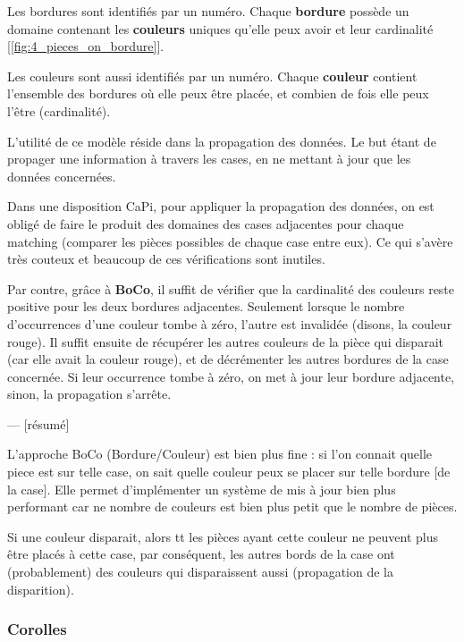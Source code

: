 	Les bordures sont identifiés par un numéro. Chaque \textbf{bordure} possède un domaine contenant les \textbf{couleurs} uniques qu'elle peux avoir et leur cardinalité [\autoref{fig:4_pieces_on_bordure}].
	
	Les couleurs sont aussi identifiés par un numéro. Chaque \textbf{couleur} contient l'ensemble des bordures où elle peux être placée, et combien de fois elle peux l'être (cardinalité).
	
	L'utilité de ce modèle réside dans la propagation des données. Le but étant de propager une information à travers les cases, en ne mettant à jour que les données concernées.
	
	Dans une disposition CaPi, pour appliquer la propagation des données, on est obligé de faire le produit des domaines des cases adjacentes pour chaque matching (comparer les pièces possibles de chaque case entre eux). Ce qui s'avère très couteux et beaucoup de ces vérifications sont inutiles.
	
	Par contre, grâce à \textbf{BoCo}, il suffit de vérifier que la cardinalité des couleurs reste positive pour les deux bordures adjacentes. Seulement lorsque le nombre d'occurrences d'une couleur tombe à zéro, l'autre est invalidée (disons, la couleur rouge). Il suffit ensuite de récupérer les autres couleurs de la pièce qui disparait (car elle avait la couleur rouge), et de décrémenter les autres bordures de la case concernée. Si leur occurrence tombe à zéro, on met à jour leur bordure adjacente, sinon, la propagation s'arrête.
	
	--- [résumé]

	L'approche BoCo (Bordure/Couleur) est bien plus fine : si l'on connait quelle piece est sur telle case, on sait quelle couleur peux se placer sur telle bordure [de la case]. Elle permet d'implémenter un système de mis à jour bien plus performant car ne nombre de couleurs est bien plus petit que le nombre de pièces.

	\begin{exmp}
		Si une couleur disparait, alors tt les pièces ayant cette couleur ne peuvent plus être placés à cette case, par conséquent, les autres bords de la case ont (probablement) des couleurs qui disparaissent aussi (propagation de la disparition).
	\end{exmp}

	\subsubsection{Corolles}


